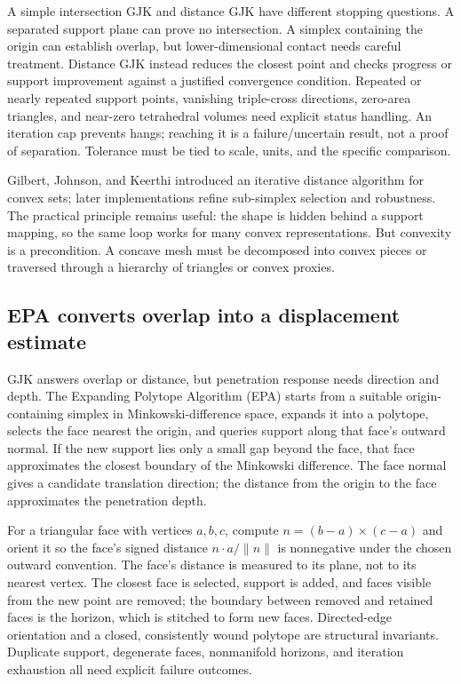 A simple intersection GJK and distance GJK have different stopping questions. A separated support plane can prove no intersection. A simplex containing the origin can establish overlap, but lower-dimensional contact needs careful treatment. Distance GJK instead reduces the closest point and checks progress or support improvement against a justified convergence condition. Repeated or nearly repeated support points, vanishing triple-cross directions, zero-area triangles, and near-zero tetrahedral volumes need explicit status handling. An iteration cap prevents hangs; reaching it is a failure/uncertain result, not a proof of separation. Tolerance must be tied to scale, units, and the specific comparison.

Gilbert, Johnson, and Keerthi introduced an iterative distance algorithm for convex sets; later implementations refine sub-simplex selection and robustness. The practical principle remains useful: the shape is hidden behind a support mapping, so the same loop works for many convex representations. But convexity is a precondition. A concave mesh must be decomposed into convex pieces or traversed through a hierarchy of triangles or convex proxies.

\subsection{EPA converts overlap into a displacement estimate}\label{03-visual-computing-i-ch020-epa-converts-overlap-into-a-displacement-estimate}

GJK answers overlap or distance, but penetration response needs direction and depth. The Expanding Polytope Algorithm (EPA) starts from a suitable origin-containing simplex in Minkowski-difference space, expands it into a polytope, selects the face nearest the origin, and queries support along that face's outward normal. If the new support lies only a small gap beyond the face, that face approximates the closest boundary of the Minkowski difference. The face normal gives a candidate translation direction; the distance from the origin to the face approximates the penetration depth.

For a triangular face with vertices \(a,b,c\), compute \(n=(b-a)\times(c-a)\) and orient it so the face's signed distance \(n\cdot a/\|n\|\) is nonnegative under the chosen outward convention. The face's distance is measured to its plane, not to its nearest vertex. The closest face is selected, support is added, and faces visible from the new point are removed; the boundary between removed and retained faces is the horizon, which is stitched to form new faces. Directed-edge orientation and a closed, consistently wound polytope are structural invariants. Duplicate support, degenerate faces, nonmanifold horizons, and iteration exhaustion all need explicit failure outcomes.

